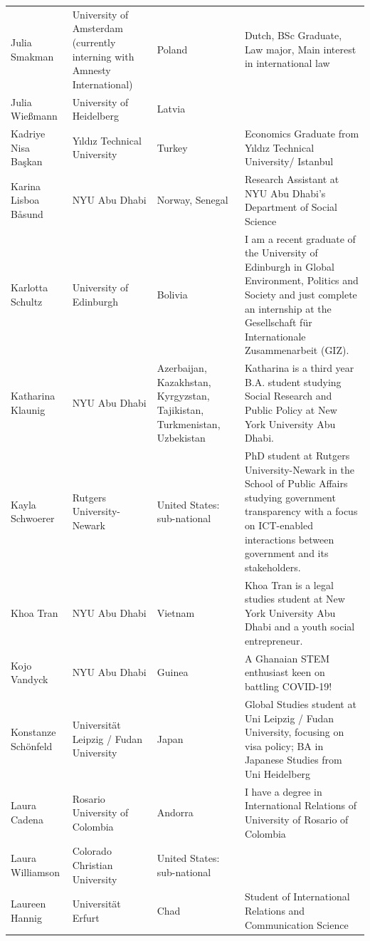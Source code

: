 \documentclass[]{article}
\begin{document}
\begin{longtable}{l>{\raggedright\arraybackslash}p{2cm}>{\raggedright\arraybackslash}p{2cm}>{\raggedright\arraybackslash}p{3cm}}
\addlinespace
Julia Smakman & University of Amsterdam (currently interning with Amnesty International) & Poland & Dutch, BSc Graduate, Law major, Main interest in international law\\
\rowcolor{gray!6}  Julia Wießmann & University of Heidelberg & Latvia & \\
Kadriye Nisa Başkan & Yıldız Technical University & Turkey & Economics Graduate from Yıldız Technical University/ Istanbul\\
\rowcolor{gray!6}  Karina Lisboa Båsund & NYU Abu Dhabi & Norway, Senegal & Research Assistant at NYU Abu Dhabi's Department of Social Science\\
Karlotta Schultz & University of Edinburgh & Bolivia & I am a recent graduate of the University of Edinburgh in Global Environment, Politics and Society and just complete an internship at the Gesellschaft für Internationale Zusammenarbeit (GIZ).\\
\addlinespace
\rowcolor{gray!6}  Katharina Klaunig & NYU Abu Dhabi & Azerbaijan, Kazakhstan, Kyrgyzstan, Tajikistan, Turkmenistan, Uzbekistan & Katharina is a third year B.A. student studying Social Research and Public Policy at New York University Abu Dhabi.\\
Kayla Schwoerer & Rutgers University-Newark & United States: sub-national & PhD student at Rutgers University-Newark in the School of Public Affairs studying government transparency with a focus on ICT-enabled interactions between government and its stakeholders.\\
\rowcolor{gray!6}  Khoa Tran & NYU Abu Dhabi & Vietnam & Khoa Tran is a legal studies student at New York University Abu Dhabi and a youth social entrepreneur.\\
Kojo Vandyck & NYU Abu Dhabi & Guinea & A Ghanaian STEM enthusiast keen on battling COVID-19!\\
\rowcolor{gray!6}  Konstanze Schönfeld & Universität Leipzig / Fudan University & Japan & Global Studies student at Uni Leipzig / Fudan University, focusing on visa policy; BA in Japanese Studies from Uni Heidelberg\\
\addlinespace
Laura Cadena & Rosario University of Colombia & Andorra & I have a degree in International Relations of University of Rosario of Colombia\\
\rowcolor{gray!6}  Laura Williamson & Colorado Christian University & United States: sub-national & \\
Laureen Hannig & Universität Erfurt & Chad & Student of International Relations and Communication Science\\

\end{longtable}
\end{document}
